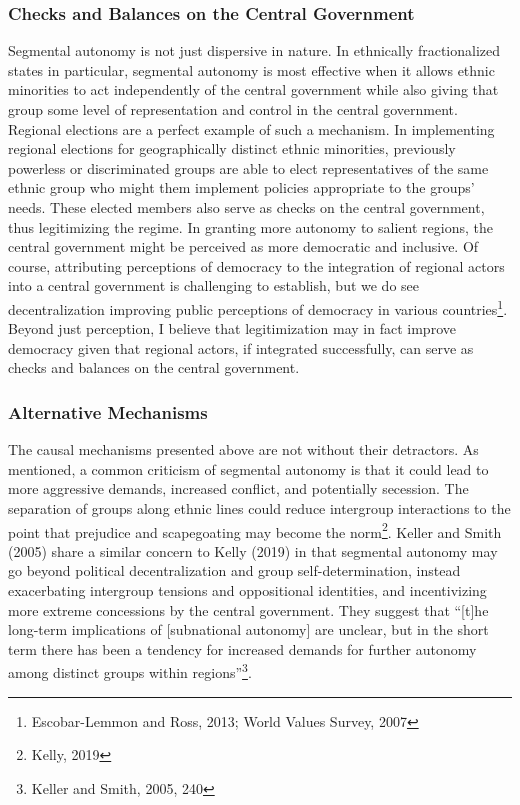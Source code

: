 \documentclass[12pt]{article}
\begin{document}
\subsubsection{Checks and Balances on the Central Government}
Segmental autonomy is not just dispersive in nature. In ethnically fractionalized states in particular, segmental autonomy is most effective when it allows ethnic minorities to act independently of the central government while also giving that group some level of representation and control in the central government. Regional elections are a perfect example of such a mechanism. In implementing regional elections for geographically distinct ethnic minorities, previously powerless or discriminated groups are able to elect representatives of the same ethnic group who might them implement policies appropriate to the groups' needs. These elected members also serve as checks on the central government, thus legitimizing the regime. In granting more autonomy to salient regions, the central government might be perceived as more democratic and inclusive. Of course, attributing perceptions of democracy to the integration of regional actors into a central government is challenging to establish, but we do see decentralization improving public perceptions of democracy in various countries\footnote{Escobar-Lemmon and Ross, 2013; World Values Survey, 2007}. Beyond just perception, I believe that legitimization may in fact improve democracy given that regional actors, if integrated successfully, can serve as checks and balances on the central government.

\subsubsection{Alternative Mechanisms}
The causal mechanisms presented above are not without their detractors. As mentioned, a common criticism of segmental autonomy is that it could lead to more aggressive demands, increased conflict, and potentially secession. The separation of groups along ethnic lines could reduce intergroup interactions to the point that prejudice and scapegoating may become the norm\footnote{Kelly, 2019}. Keller and Smith (2005) share a similar concern to Kelly (2019) in that segmental autonomy may go beyond political decentralization and group self-determination, instead exacerbating intergroup tensions and oppositional identities, and incentivizing more extreme concessions by the central government. They suggest that “[t]he long-term implications of [subnational autonomy] are unclear, but in the short term there has been a tendency for increased demands for further autonomy among distinct groups within regions”\footnote{Keller and Smith, 2005, 240}. 
\end{document}
